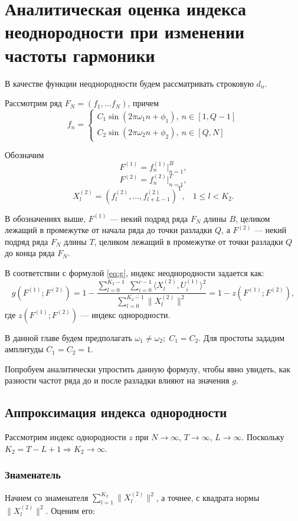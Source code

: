 \documentclass[specialist, substylefile = spbu.rtx,
			   subf, href, 12pt]{disser}
\begin{document}
\newpage
\chapter{Аналитическая оценка индекса неоднородности при изменении частоты гармоники} \label{sec:ch_4}
В качестве функции неоднородности будем рассматривать строковую $ d_n $.

Рассмотрим ряд $ F_N = (f_1, \dots f_{N}) $, причем  
\begin{equation*} 
	f_n = 
	\begin{cases} 
		C_1\sin(2\pi\omega_1 n + \phi_1),\ n \in [1, Q-1] \\ 
		C_2\sin(2\pi\omega_2 n + \phi_2),\ n \in [Q, N] 
	\end{cases} 
\end{equation*} 

Обозначим 
$$ F^{(1)} = f_n^{(1)}|_{n=1}^{B}, $$
$$ F^{(2)} = f_n^{(2)}|_{n=1}^{T}, $$
$$X_l^{(2)} = (f_{l}^{(2)}, \dotsc, f_{l+L-1}^{(2)})^\mathrm{T}, \;\;\; 1 \leq l < K_2.$$

В обозначениях выше, $ F^{(1)} $ --- некий подряд ряда $ F_N $ длины $ B $, целиком лежащий в промежутке от начала ряда до точки разладки $ Q $, а  $ F^{(2)} $ --- некий подряд ряда $ F_N $ длины $ T $, целиком лежащий в промежутке от точки разладки $ Q $ до конца ряда $ F_N $. 


В соответствии с формулой \eqref{eq:g}, индекс неоднородности задается как:
$$ g(F^{(1)}; F^{(2)}) = 1 - \frac{\sum\limits_{l=0}^{K_2-1}\;\sum\limits_{i=0}^{r-1}\langle X_l^{(2)}, U_i^{(1)}\rangle^2}{\sum\limits_{l=0}^{K_2-1}\|X_l^{(2)}\|^2} = 1 - z(F^{(1)}; F^{(2)}),  $$
где $ z(F^{(1)}; F^{(2)}) $ --- индекс однородности.

В данной главе будем предполагать $ \omega_1 \neq \omega_2;\; C_1 = C_2 $. Для простоты зададим амплитуды $ C_1 = C_2 = 1 $.

Попробуем аналитически упростить данную формулу, чтобы явно увидеть, как разности частот ряда до и после разладки влияют на значения $ g $.

\section{Аппроксимация индекса однородности}
Рассмотрим индекс однородности $ z $ при $ N \rightarrow \infty $, $ T \rightarrow \infty $, $ L \rightarrow \infty $. Поскольку $ K_2 = T - L + 1 \Rightarrow K_2 \rightarrow \infty $.


\subsection{Знаменатель}
Начнем со знаменателя $\sum\limits_{l=1}^{K_2}\|X_l^{(2)}\|^2$, а точнее, с квадрата нормы $\|X_l^{(2)}\|^2$. Оценим его:
\end{document}
